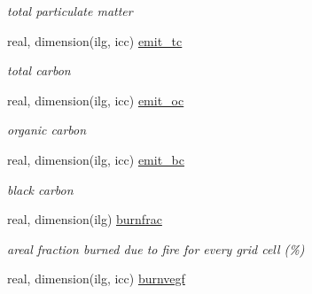 \begin{DoxyCompactItemize}
\begin{DoxyCompactList}\small\item\em total particulate matter \end{DoxyCompactList}\item 
\hypertarget{structctem__statevars_1_1veg__gat_a98f2b9f7a2ccb319a7ad5e0baf9bf3f4}{}real, dimension(ilg, icc) \hyperlink{structctem__statevars_1_1veg__gat_a98f2b9f7a2ccb319a7ad5e0baf9bf3f4}{emit\+\_\+tc}\label{structctem__statevars_1_1veg__gat_a98f2b9f7a2ccb319a7ad5e0baf9bf3f4}

\begin{DoxyCompactList}\small\item\em total carbon \end{DoxyCompactList}\item 
\hypertarget{structctem__statevars_1_1veg__gat_aeda0ecdd6b9a8bbd4bc586c0208060fe}{}real, dimension(ilg, icc) \hyperlink{structctem__statevars_1_1veg__gat_aeda0ecdd6b9a8bbd4bc586c0208060fe}{emit\+\_\+oc}\label{structctem__statevars_1_1veg__gat_aeda0ecdd6b9a8bbd4bc586c0208060fe}

\begin{DoxyCompactList}\small\item\em organic carbon \end{DoxyCompactList}\item 
\hypertarget{structctem__statevars_1_1veg__gat_a8cffcf910b8c1901e1c6b7b8b17402c6}{}real, dimension(ilg, icc) \hyperlink{structctem__statevars_1_1veg__gat_a8cffcf910b8c1901e1c6b7b8b17402c6}{emit\+\_\+bc}\label{structctem__statevars_1_1veg__gat_a8cffcf910b8c1901e1c6b7b8b17402c6}

\begin{DoxyCompactList}\small\item\em black carbon \end{DoxyCompactList}\item 
\hypertarget{structctem__statevars_1_1veg__gat_ac62ff9ab6f726bddbf3c895e892fbaba}{}real, dimension(ilg) \hyperlink{structctem__statevars_1_1veg__gat_ac62ff9ab6f726bddbf3c895e892fbaba}{burnfrac}\label{structctem__statevars_1_1veg__gat_ac62ff9ab6f726bddbf3c895e892fbaba}

\begin{DoxyCompactList}\small\item\em areal fraction burned due to fire for every grid cell (\%) \end{DoxyCompactList}\item 
\hypertarget{structctem__statevars_1_1veg__gat_ab5062be4d8f876f09ca813bb836da1db}{}real, dimension(ilg, icc) \hyperlink{structctem__statevars_1_1veg__gat_ab5062be4d8f876f09ca813bb836da1db}{burnvegf}\label{structctem__statevars_1_1veg__gat_ab5062be4d8f876f09ca813bb836da1db}


\end{DoxyCompactItemize}
